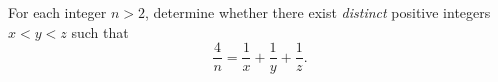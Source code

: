 For each integer $n>2$, determine whether there exist \emph{distinct} positive integers $x<y<z$ such that
\[
\frac{4}{n}=\frac{1}{x}+\frac{1}{y}+\frac{1}{z}.
\]
